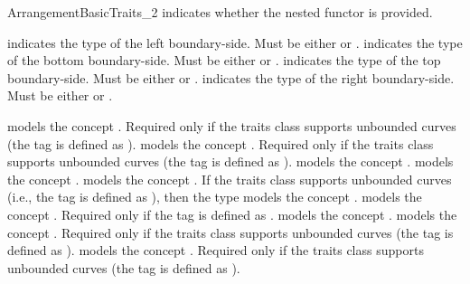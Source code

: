\begin{ccRefConcept}{ArrangementBasicTraits_2}
  {indicates whether the nested functor  is
  provided.} 

  {indicates the type of the left boundary-side. Must be either
   or .}
  {indicates the type of the bottom boundary-side. Must be either
   or .}
  {indicates the type of the top boundary-side. Must be either
   or .}
  {indicates the type of the right boundary-side. Must be either
   or .}

\ccThreeToTwo
{}
\ccGlue
{}
\ccGlue
{}
  {models the concept .
  Required only if the traits class supports unbounded curves
  (the  tag is defined as ).}
\ccGlue
{}
  {models the concept .
  Required only if the traits class supports unbounded curves
  (the  tag is defined as ).}
\ccGlue
{}
  {models the concept .}
\ccGlue
{}
  {models the concept .}
\ccGlue
{}
\ccGlue
{}
  {models the concept .
  If the traits class supports unbounded curves (i.e., the
   tag is defined as ), then
  the type models the concept .}
\ccGlue
{}
  {models the concept .
  Required only if the  tag is defined as
  .}
\ccGlue
{}
  {models the concept .}
\ccGlue
{}
\ccGlue
{}
  {models the concept .
  Required only if the traits class supports unbounded curves
  (the  tag is defined as ).}
\ccGlue
{}
  {models the concept .
  Required only if the traits class supports unbounded curves
  (the  tag is defined as ).}


\end{ccRefConcept}

